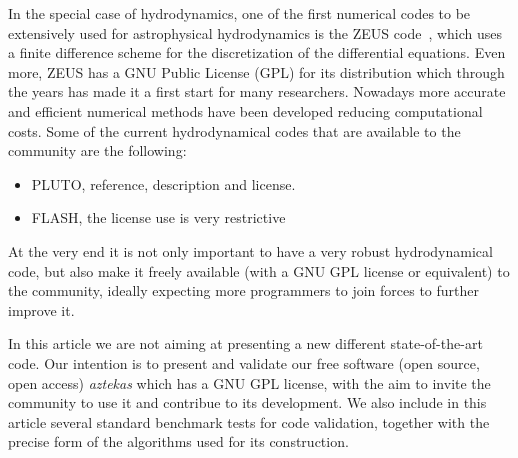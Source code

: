 In the special case of hydrodynamics, one of the first numerical codes
to be extensively used for astrophysical hydrodynamics is the ZEUS
code~\citep{stone1992}, which uses a finite difference scheme for the
discretization of the differential equations.  Even more, ZEUS has a GNU
Public License (GPL) for its distribution which through the years has made it a
first start for many researchers.  Nowadays more accurate and efficient
numerical methods have been developed reducing computational costs.  Some
of the current hydrodynamical codes that are available to the community are
the following:

\begin{itemize}
  \item PLUTO, reference, description and license.
  \item FLASH, the license use is very restrictive
\end{itemize}

  At the very end it is not only important to have a very robust
hydrodynamical code, but also make it freely available (with a GNU GPL
license or equivalent) to the community, ideally expecting more programmers
to join forces to further improve it.

  In this article we are not aiming at presenting a new different
state-of-the-art code.  Our intention is 
to present and validate our free software (open source, open access)
\textit{aztekas} which has a GNU GPL license, with the aim 
to invite the community to use it and contribue to its development. We also 
include in this article several standard benchmark tests for code
validation, together with the precise form of the algorithms used for its
construction. 



